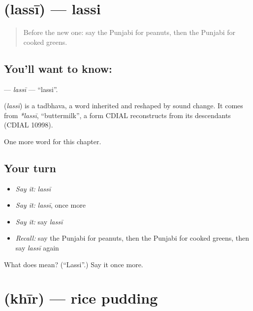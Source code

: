 \section[\texorpdfstring{\pa{ਲੱਸੀ} (lassī)}{ਲੱਸੀ (lassī)}]{ (lassī) — lassi}

\label{lesson:PA-C124-lassi}



\begin{quote}
Before the new one: say the Punjabi for peanuts, then the Punjabi for cooked greens.
\end{quote}

\subsection*{You'll want to know: }
\textbf{} — \emph{lassī} — \textquotedblleft{}lassi\textquotedblright{}.

\begin{cousinweb}
\textbf{} (\emph{lassī}) is a tadbhava, a word inherited and reshaped by sound change. It comes from \emph{*lassī}, \textquotedblleft{}buttermilk\textquotedblright{}, a form CDIAL reconstructs from its descendants (CDIAL 10998).
\end{cousinweb}

\begin{grammarlens}[title={What you've built}]
One more word for this chapter.
\end{grammarlens}

\subsection*{Your turn}
\begin{itemize}
\raggedright
  \item \emph{Say it:} \emph{lassī}
  \item \emph{Say it:} \emph{lassī}, once more
  \item \emph{Say it:} say \emph{lassī}
  \item \emph{Recall:} say the Punjabi for peanuts, then the Punjabi for cooked greens, then say \emph{lassī} again
\end{itemize}

\begin{tcolorbox}[breakable,colback=teal!4,colframe=teal!35!black,title={Before you move on}]
What does  mean? (\textquotedblleft{}Lassi\textquotedblright{}.) Say it once more.
\end{tcolorbox}
\section[\texorpdfstring{\pa{ਖੀਰ} (khīr)}{ਖੀਰ (khīr)}]{ (khīr) — rice pudding}

